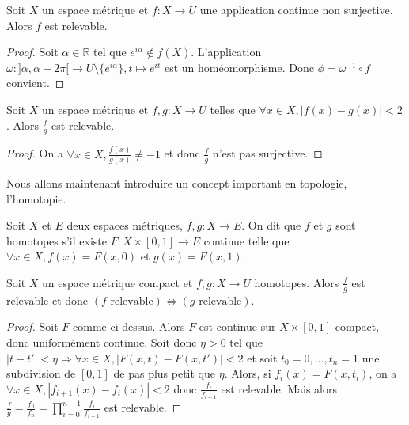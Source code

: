 \begin{prop}
Soit $X$ un espace métrique et $f : X \rightarrow U$ une application continue non surjective. Alors $f$ est relevable.
\end{prop}

\begin{proof}
Soit $\alpha \in \mathbb{R}$ tel que $e^{i\alpha} \notin f(X)$. L'application $\omega : ]\alpha,\alpha+2\pi[ \rightarrow U \setminus \{e^{i\alpha}\}, t \mapsto e^{it}$ est un homéomorphisme. Donc $\phi = \omega^{-1} \circ f$ convient.
\end{proof}

\begin{thm}
Soit $X$ un espace métrique et $f,g : X \rightarrow U$ telles que $\forall x \in X, |f(x) - g(x)| < 2$. Alors $\frac{f}{g}$ est relevable.
\end{thm}

\begin{proof}
On a $\forall x \in X, \frac{f(x)}{g(x)} \neq -1$ et donc $\frac{f}{g}$ n'est pas surjective.
\end{proof}

Nous allons maintenant introduire un concept important en topologie, l'homotopie.

\begin{de}
Soit $X$ et $E$ deux espaces métriques, $f,g : X \rightarrow E$. On dit que $f$ et $g$ sont homotopes s'il existe $F : X \times [0,1] \rightarrow E$ continue telle que $\forall x \in X, f(x) = F(x,0)$ et $g(x) = F(x,1)$.
\end{de}

\begin{thm}
Soit $X$ un espace métrique compact et $f,g : X \rightarrow U$ homotopes. Alors $\frac{f}{g}$ est relevable et donc $(f \text{ relevable}) \Leftrightarrow (g \text{ relevable})$.
\end{thm}

\begin{proof}
Soit $F$ comme ci-dessus. Alors $F$ est continue sur $X \times [0,1]$ compact, donc uniformément continue. Soit donc $\eta > 0$ tel que $|t - t'| < \eta \Rightarrow \forall x \in X, |F(x,t) - F(x,t')| < 2$ et soit $t_0 = 0, \ldots, t_n = 1$ une subdivision de $[0,1]$ de pas plus petit que $\eta$. Alors, si $f_i(x) = F(x,t_i)$, on a $\forall x \in X, |f_{i+1}(x) - f_i(x)| < 2$ donc $\frac{f_i}{f_{i+1}}$ est relevable. Mais alors $\frac{f}{g} = \frac{f_0}{f_n} = \prod_{i=0}^{n-1} \frac{f_i}{f_{i+1}}$ est relevable.
\end{proof}

